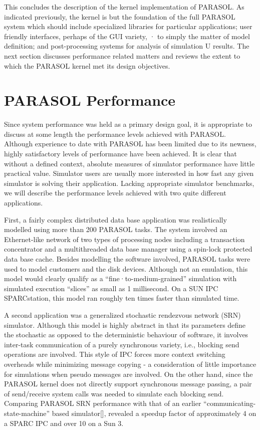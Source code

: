 \documentclass[11pt]{article}
\begin{document}
This concludes the description of the kernel implementation of PARASOL. As indicated
previously, the kernel is but the foundation of the full PARASOL system which should include
specialized libraries for particular applications; user friendly interfaces, perhaps of the GUI variety, ·
to simply the matter of model definition; and post-processing systems for analysis of simulation U
results. The next section discusses performance related matters and reviews the extent to which the
PARASOL kernel met its design objectives.

\section{PARASOL Performance}
\label{sec:performance}

Since system performance was held as a primary design goal, it is appropriate to discuss at some
length the performance levels achieved with PARASOL. Although experience to date with 
PARASOL has been limited due to its newness, highly satisfactory levels of performance have 
been achieved. It is clear that without a defined context, absolute measures of simulator
performance have little practical value. Simulator users are usually more interested in how fast any 
given simulator is solving their application. Lacking appropriate simulator benchmarks, we will
describe the performance levels achieved with two quite different applications.

First, a fairly complex distributed data base application was realistically modelled using more than
200 PARASOL tasks. The system involved an Ethernet-like network of two types of processing
nodes including a transaction concentrator and a multithreaded data base manager using a spin-lock
protected data base cache. Besides modelling the software involved, PARASOL tasks were used
to model customers and the disk devices. Although not an emulation, this model would clearly
qualify as a ``fine·to-medium-grained'' simulation with simulated execution ``slices'' as small as 1
millisecond. On a SUN IPC SPARCstation, this model ran roughly ten times faster than simulated
time.

A second application was a generalized stochastic rendezvous network (SRN) simulator. Although
this model is highly abstract in that its parameters define the stochastic as opposed to the
deterministic behaviour of software, it involves inter-task communication of a purely synchronous
variety, i.e., blocking send operations are involved. This style of IPC forces more context
switching overheads while minimizing message copying - a consideration of little importance for
simulations when pseudo messages are involved. On the other hand, since the PARASOL kernel
does not directly support synchronous message passing, a pair of send/receive system calls was
needed to simulate each blocking send. Comparing PARASOL SRN performance with that of an
earlier ``communicating-state-machine'' based simulator[], revealed a speedup factor of
approximately 4 on a SPARC IPC and over 10 on a Sun 3.
\end{document}
